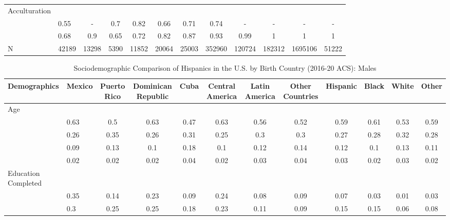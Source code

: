\documentclass[
]{article}
\begin{document}
\begin{landscape}
\begin{table}[ht]
\begin{tabular}{>{\raggedright\arraybackslash}p{3.2cm}|lcccccc|cccc}
  Acculturation &  &  &  &  &  &  &  &  &  &  &  \\ 
  \multicolumn{1}{>{\raggedleft\arraybackslash}p{1.6cm}|}{\makebox[1.6cm][r]{Citizen }}& 0.55 & - & 0.7 & 0.82 & 0.66 & 0.71 & 0.74 & - & - & - & - \\ 
  \multicolumn{1}{>{\raggedleft\arraybackslash}p{3cm}|}{\makebox[3cm][r]{English Speakers }}& 0.68 & 0.9 & 0.65 & 0.72 & 0.82 & 0.87 & 0.93 & 0.99 & 1 & 1 & 1 \\ 
  N & 42189 & 13298 & 5390 & 11852 & 20064 & 25003 & 352960 & 120724 & 182312 & 1695106 & 51222 \\ 
   \hline
\end{tabular}
\endgroup
\end{table}


\begin{table}[ht]
\centering
\caption{Sociodemographic Comparison of Hispanics in the U.S. by Birth Country (2016-20 ACS): Males} 
\begingroup\small
\begin{tabular}{>{\raggedright\arraybackslash}p{3.2cm}|lcccccc|cccc}
  \hline
Demographics & Mexico & Puerto Rico & Dominican Republic & Cuba & Central America & Latin America & Other Countries & Hispanic & Black & White & Other \\ 
  \hline
Age &  &  &  &  &  &  &  &  &  &  &  \\ 
  \multicolumn{1}{>{\raggedleft\arraybackslash}p{1.5cm}|}{\makebox[1.5cm][r]{60 - 69 }}& 0.63 & 0.5 & 0.63 & 0.47 & 0.63 & 0.56 & 0.52 & 0.59 & 0.61 & 0.53 & 0.59 \\ 
  \multicolumn{1}{>{\raggedleft\arraybackslash}p{1.5cm}|}{\makebox[1.5cm][r]{70 - 79 }}& 0.26 & 0.35 & 0.26 & 0.31 & 0.25 & 0.3 & 0.3 & 0.27 & 0.28 & 0.32 & 0.28 \\ 
  \multicolumn{1}{>{\raggedleft\arraybackslash}p{1.5cm}|}{\makebox[1.5cm][r]{80 - 89 }}& 0.09 & 0.13 & 0.1 & 0.18 & 0.1 & 0.12 & 0.14 & 0.12 & 0.1 & 0.13 & 0.11 \\ 
  \multicolumn{1}{>{\raggedleft\arraybackslash}p{1.5cm}|}{\makebox[1.5cm][r]{90 plus }}& 0.02 & 0.02 & 0.02 & 0.04 & 0.02 & 0.03 & 0.04 & 0.03 & 0.02 & 0.03 & 0.02 \\ 
  Education Completed &  &  &  &  &  &  &  &  &  &  &  \\ 
  \multicolumn{1}{>{\raggedleft\arraybackslash}p{3.2cm}|}{\makebox[3.2cm][r]{Less than Primary }}& 0.35 & 0.14 & 0.23 & 0.09 & 0.24 & 0.08 & 0.09 & 0.07 & 0.03 & 0.01 & 0.03 \\ 
  \multicolumn{1}{>{\raggedleft\arraybackslash}p{1.7cm}|}{\makebox[1.7cm][r]{Primary }}& 0.3 & 0.25 & 0.25 & 0.18 & 0.23 & 0.11 & 0.09 & 0.15 & 0.15 & 0.06 & 0.08 \\ 

\end{tabular}
\end{table}
\end{landscape}
\end{document}

